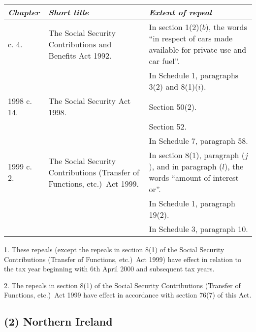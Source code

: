 \documentclass[12pt,a4paper]{article}
\begin{document}
{\footnotesize
\begin{longtable}{p{45.96pt}p{134.92946pt}p{173.11526pt}}
\hline
\itshape Chapter	&\itshape Short title	&\itshape Extent of repeal\\
\hline
\endhead
\hline
\endlastfoot
1992 c. 4. &	The Social Security Contributions and Benefits Act 1992. 	&In section 1(2)($b$), the words “in respect of cars made available for private use and car fuel”.\\
&		&In Schedule 1, paragraphs 3(2)  and 8(1)($i$).\\
1998 c. 14. 	&The Social Security Act 1998. 	&Section 50(2).\\
&&		Section 52. \\
&&		In Schedule 7, paragraph 58. \\
1999 c. 2. 	&The Social Security Contributions (Transfer of Functions, etc.)\ Act 1999. 	&In section 8(1), paragraph ($j$), and in paragraph ($l$), the words “amount of interest or”.\\
&&		In Schedule 1, paragraph 19(2).\\
	&&	In Schedule 3, paragraph 10. \\
\end{longtable}

}

1. 
These repeals (except the repeals in section 8(1)  of the Social Security Contributions (Transfer of Functions, etc.)\ Act 1999) have effect in relation to the tax year beginning with 6th April 2000 and subsequent tax years.

2. 
The repeals in section 8(1)  of the Social Security Contributions (Transfer of Functions, etc.)\ Act 1999 have effect in accordance with section 76(7)  of this Act.

\subsection*{
(2) 
Northern Ireland}
\end{document}
